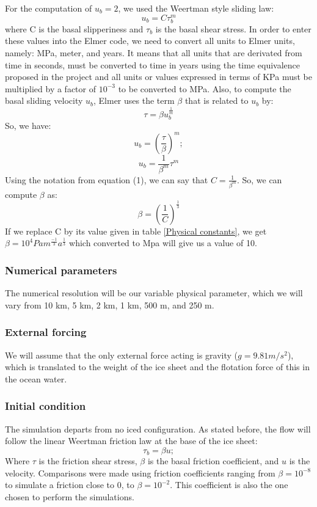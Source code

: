 \documentclass{article}
\begin{document}
For the computation of $u_b=2$, we used the Weertman style sliding law:
\begin{equation}
    u_b = C\tau _b^m
\end{equation}
where C is the basal slipperiness and $\tau _b$ is the basal shear stress.
In order to enter these values into the Elmer code, we need to convert all units to Elmer units, namely: MPa, meter, and years. It means that all units that are derivated from time in seconds, must be converted to time in years using the time equivalence proposed in the project and all units or values expressed in terms of KPa must be multiplied by a factor of $10^{-3}$ to be converted to MPa.
Also, to compute the basal sliding velocity $u_b$, Elmer uses the term $\beta$ that is related to $u_b$ by:
\begin{equation}
    \tau = \beta u_b^{\frac{1}{m}}
\end{equation}
So, we have:
\begin{equation}
    u_b = (\frac{\tau}{\beta})^m;
\end{equation}
\begin{equation}
    u_b = \frac{1}{\beta^m} \tau^m
\end{equation}
Using the notation from equation (1), we can say that $C=  \frac{1}{\beta^m}$. So, we can compute $\beta$ as:
\begin{equation}
    \beta=(\frac{1}{C})^{\frac{1}{3}}
\end{equation}
If we replace C by its value given in table \ref{Physical constants}, we get $\beta= 10^4 Pa m^{\frac{-1}{3}} a^{\frac{1}{3}}$ which converted to Mpa will give us a value of 10.

\subsubsection{Numerical parameters}
The numerical resolution will be our variable physical parameter, which we will vary from 10 km, 5 km, 2 km, 1 km, 500 m, and 250 m. 
\subsubsection{External forcing}
We will assume that the only external force acting is gravity ($g=9.81 m/s^2$), which is translated to the weight of the ice sheet and the flotation force of this in the ocean water.
\subsubsection{Initial condition}
The simulation departs from no iced configuration. 
As stated before, the flow will follow the linear Weertman friction law at the base of the ice sheet:
\begin{equation}
	\tau_b=\beta u;
\end{equation}
Where $\tau$ is the friction shear stress, $\beta$ is the basal friction coefficient, and $u$ is the velocity.
Comparisons were made using friction coefficients ranging from $\beta=10^{-8}$ to simulate a friction close to 0, to $\beta=10^{-2}$. This coefficient is also the one chosen to perform the simulations. 
\end{document}
